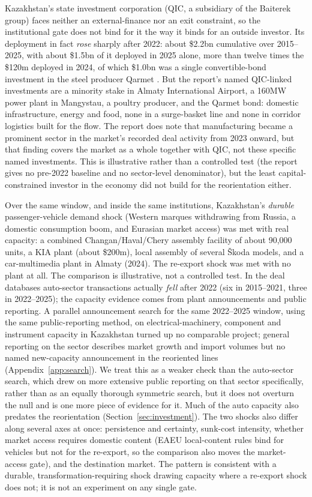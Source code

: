 \documentclass[12pt]{article}
\begin{document}
Kazakhstan's state
investment corporation (QIC, a subsidiary of the Baiterek group) faces neither an
external-finance nor an exit constraint, so the institutional gate does not bind for it the
way it binds for an outside investor. Its deployment in fact \emph{rose} sharply after 2022:
about \$2.2bn cumulative over 2015--2025, with about \$1.5bn of it deployed in 2025 alone, more
than twelve times the \$120m deployed in 2024, of which \$1.0bn was a single convertible-bond
investment in the steel producer Qarmet \citep{qicaifcifc2026pe}. But the report's named
QIC-linked investments are a minority stake in Almaty International Airport, a 160MW
power plant in Mangystau, a poultry producer, and the Qarmet bond: domestic infrastructure,
energy and food, none in a surge-basket line and none in corridor logistics built for the
flow. The report does note that manufacturing became a prominent sector in the market's
recorded deal activity from 2023 onward, but that finding covers the market as a whole
together with QIC, not these specific named investments. This is
illustrative rather than a controlled test (the report gives no pre-2022 baseline and no
sector-level denominator), but the least capital-constrained investor in the economy did not
build for the reorientation either.

Over the same window, and inside the same institutions, Kazakhstan's \emph{durable}
passenger-vehicle demand shock (Western marques withdrawing from
Russia, a domestic consumption boom, and Eurasian market access) was met with real capacity:
a combined Changan\slash Haval\slash Chery assembly facility of about 90{,}000 units, a KIA
plant (about \$200m), local assembly of several \v{S}koda models, and a car-multimedia plant
in Almaty (2024). The re-export shock was met with no plant at all. The comparison is
illustrative, not a controlled test. In the deal
databases auto-sector transactions actually \emph{fell} after 2022 (six in 2015--2021, three
in 2022--2025); the capacity evidence comes from plant announcements and public reporting. A
parallel announcement search for the same 2022--2025 window, using the same public-reporting
method, on electrical-machinery, component and instrument capacity in Kazakhstan turned up
no comparable project; general reporting on the sector describes market growth and import
volumes but no named new-capacity announcement in the reoriented lines
(Appendix~\ref{app:search}). We treat this as a
weaker check than the auto-sector search, which drew on more extensive public reporting on
that sector specifically, rather than as an equally thorough symmetric search, but it does not
overturn the null and is one more piece of evidence for it. Much of the auto capacity also
predates the reorientation
(Section~\ref{sec:investment}). The two shocks also differ along several axes at once:
persistence and certainty, sunk-cost intensity, whether market access requires domestic
content (EAEU local-content rules bind for vehicles but not for the re-export, so the
comparison also moves the market-access gate), and the destination market. The pattern is
consistent with a durable, transformation-requiring shock drawing capacity where a re-export
shock does not; it is not an experiment on any single gate.
\end{document}
